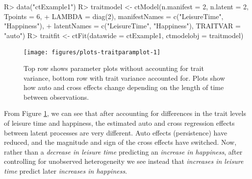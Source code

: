 \documentclass[nojss]{jss}\usepackage[]{graphicx}\usepackage[]{color}
\begin{document}
\begin{Schunk}
\begin{Sinput}
R> data("ctExample1")
R> traitmodel <- ctModel(n.manifest = 2, n.latent = 2, Tpoints = 6, 
+   LAMBDA = diag(2), manifestNames = c("LeisureTime", "Happiness"), 
+   latentNames = c("LeisureTime", "Happiness"), TRAITVAR = "auto")
R> traitfit <- ctFit(datawide = ctExample1, ctmodelobj = traitmodel)
\end{Sinput}
\end{Schunk}

\begin{figure}[!h]
\begin{Schunk}


{\centering \texttt{[image: figures/plots-traitparamplot-1]} 

}

\end{Schunk}
\caption{ \label{fig:traitparamplots} Top row shows parameter plots without accounting for trait variance, bottom row with trait variance accounted for. Plots show how auto and cross effects change depending on the length of time between observations.}
\end{figure}
From Figure \ref{fig:traitparamplots}, we can see that after accounting for differences in the trait levels of leisure time and happiness, the estimated auto and cross regression effects between latent processes are very different. Auto effects (persistence) have reduced, and the magnitude and sign of the cross effects have switched. Now, rather than a \textit{decrease in leisure time} predicting an \textit{increase in happiness}, after controlling for unobserved heterogeneity we see instead that \textit{increases in leisure time} predict later \textit{increases in happiness}. 
\end{document}
